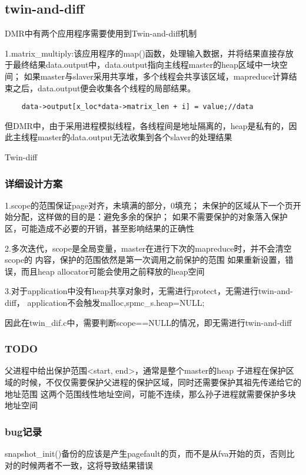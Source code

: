 \subsection{twin-and-diff}
DMR中有两个应用程序需要使用到Twin-and-diff机制

1.matrix\_multiply:该应用程序的map()函数，处理输入数据，并将结果直接存放于最终结果data.output中，data.output指向主线程master的heap区域中一块空间；
如果master与slaver采用共享堆，多个线程会共享该区域，mapreduce计算结束之后，data.output便会收集各个线程的局部结果。
  \begin{lstlisting}
    data->output[x_loc*data->matrix_len + i] = value;//data
  \end{lstlisting}
但DMR中，由于采用进程模拟线程，各线程间是地址隔离的，heap是私有的，因此主线程master的data.output无法收集到各个slaver的处理结果


Twin-diff


\subsubsection{详细设计方案}
1.scope的范围保证page对齐，未填满的部分，0填充；
未保护的区域从下一个页开始分配，这样做的目的是：避免多余的保护；
如果不需要保护的对象落入保护区，可能造成不必要的开销，甚至影响结果的正确性

2.多次迭代，scope是全局变量，master在进行下次的mapreduce时，并不会清空scope的
内容，保护的范围依然是第一次调用之前保护的范围
如果重新设置，错误，而且heap allocator可能会使用之前释放的heap空间

3.对于application中没有heap共享对象时，无需进行protect，无需进行twin-and-diff，
application不会触发malloc,spmc\_s.heap=NULL;

因此在twin\_dif.c中，需要判断scope==NULL的情况，即无需进行twin-and-diff

\subsubsection{TODO}
父进程中给出保护范围<start, end>，通常是整个master的heap
子进程在保护区域的时候，不仅仅需要保护父进程的保护区域，同时还需要保护其祖先传递给它的地址范围
这两个范围线性地址空间，可能不连续，那么孙子进程就需要保护多块地址空间

\subsubsection{bug记录}
snapshot\_init()备份的应该是产生pagefault的页，而不是从fva开始的页，否则比对的时候两者不一致，这将导致结果错误
